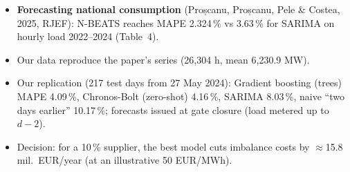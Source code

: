 \begin{itemize}\setlength{\itemsep}{2pt}
  \item \textbf{Forecasting national consumption} (Proșcanu, Proșcanu, Pele \& Costea, 2025, RJEF): N-BEATS reaches MAPE 2.324\,\% vs 3.63\,\% for SARIMA on hourly load 2022--2024 (Table~4).
  \item Our data reproduce the paper's series (26,304 h, mean 6,230.9 MW).
  \item Our replication (217 test days from 27 May 2024): Gradient boosting (trees) MAPE 4.09\,\%, Chronos-Bolt (zero-shot) 4.16\,\%, SARIMA 8.03\,\%, naive ``two days earlier'' 10.17\,\%; forecasts issued at gate closure (load metered up to $d-2$).
  \item Decision: for a 10\,\% supplier, the best model cuts imbalance costs by $\approx$15.8 mil.\ EUR/year (at an illustrative 50 EUR/MWh).
\end{itemize}

